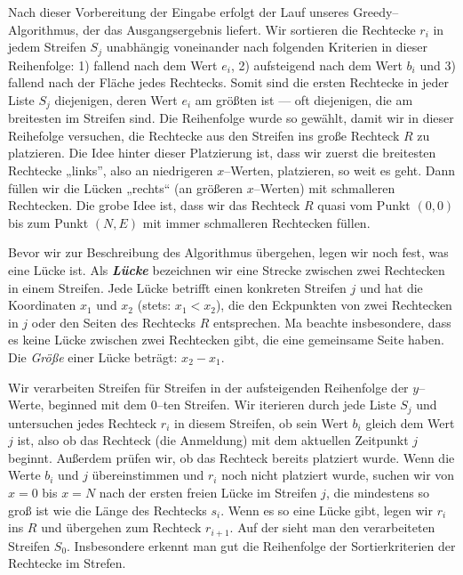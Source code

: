 Nach dieser Vorbereitung der Eingabe erfolgt der Lauf unseres Greedy--Algorithmus, der das
Ausgangsergebnis liefert.
Wir sortieren die Rechtecke $r_i$ in jedem Streifen $S_j$ unabhängig voneinander nach folgenden Kriterien
in dieser Reihenfolge: 
1) fallend nach dem Wert $e_i$,
2) aufsteigend nach dem Wert $b_i$ und
3) fallend nach der Fläche jedes Rechtecks. 
Somit sind die ersten Rechtecke in jeder Liste $S_j$ diejenigen,
deren Wert $e_i$ am größten ist --- oft diejenigen, die am breitesten im Streifen sind.
Die Reihenfolge wurde so gewählt, damit wir in dieser Reihefolge versuchen,
die Rechtecke aus den Streifen ins große Rechteck $R$ zu platzieren.
Die Idee hinter dieser Platzierung ist, dass wir zuerst die breitesten Rechtecke
„links”, also an niedrigeren $x$--Werten, platzieren, so weit es geht. Dann füllen wir 
die Lücken „rechts“ (an größeren $x$--Werten) mit schmalleren Rechtecken. 
Die grobe Idee ist, dass wir das Rechteck $R$ quasi vom Punkt $(0,0)$ bis zum Punkt
$(N, E)$ mit immer schmalleren Rechtecken füllen.

Bevor wir zur Beschreibung des Algorithmus übergehen, legen wir noch fest, was
eine Lücke ist. Als \textbf{\textit{Lücke}} bezeichnen wir eine Strecke 
zwischen zwei Rechtecken in einem Streifen. Jede Lücke betrifft einen
konkreten Streifen $j$ und hat die Koordinaten $x_1$ und $x_2$ (stets: $x_1 < x_2$),
die den Eckpunkten von zwei Rechtecken in $j$ oder den Seiten des Rechtecks $R$ entsprechen.
Ma beachte insbesondere, dass es keine Lücke zwischen zwei Rechtecken gibt,
die eine gemeinsame Seite haben.
Die \textit{Größe} einer Lücke beträgt: $x_2 - x_1$.



Wir verarbeiten Streifen für Streifen in der
aufsteigenden Reihenfolge der $y$--Werte, beginned mit dem 0--ten Streifen.
Wir iterieren durch jede Liste $S_j$ und untersuchen jedes Rechteck $r_i$ in diesem
Streifen, ob sein Wert $b_i$ gleich dem Wert $j$ ist, also ob das Rechteck (die Anmeldung) mit dem
aktuellen Zeitpunkt $j$ beginnt.
Außerdem prüfen wir, ob das Rechteck bereits platziert wurde.
Wenn die Werte $b_i$ und $j$ übereinstimmen und $r_i$ noch nicht platziert wurde, 
suchen wir von $x = 0$ bis $x = N$ nach der ersten freien Lücke im Streifen $j$,
die mindestens so groß ist wie die Länge des Rechtecks $s_i$. 
Wenn es so eine Lücke gibt, legen wir $r_i$ ins $R$ und übergehen zum Rechteck $r_{i+1}$.
Auf der  sieht man den verarbeiteten Streifen $S_0$.
Insbesondere erkennt man gut die Reihenfolge der Sortierkriterien der Rechtecke
im Strefen.

